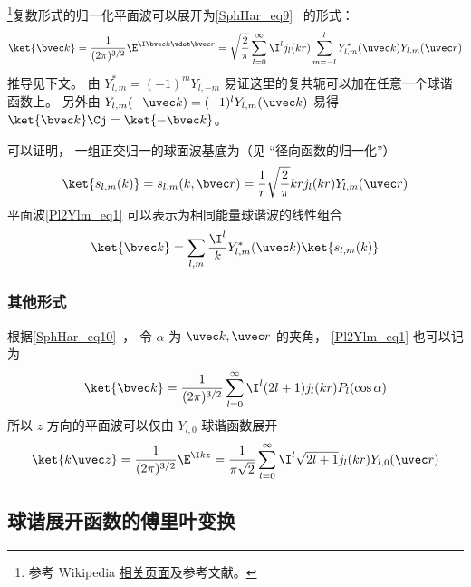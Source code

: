 

\footnote{参考 Wikipedia \href{https://en.wikipedia.org/wiki/Plane_wave_expansion}{相关页面}及参考文献。}复数形式的归一化平面波可以展开为\autoref{SphHar_eq9}~ 的形式：
\begin{equation}\label{Pl2Ylm_eq1}
\ket{\bvec k} = \frac{1}{(2\pi)^{3/2}}\E^{\I \bvec k \vdot \bvec r} = \sqrt{\frac{2}{\pi}} \sum_{l=0}^{\infty} \I^l  j_l(kr) \sum_{m=-l}^l Y_{l,m}^*(\uvec k) Y_{l,m}(\uvec r)
\end{equation}
推导见下文。 由 $Y_{l,m}^* = (-1)^m Y_{l,-m}$ 易证这里的复共轭可以加在任意一个球谐函数上。 另外由 $Y_{l,m}(-\uvec k) = (-1)^l Y_{l,m}(\uvec k)$ 易得 $\ket{\bvec k}\Cj = \ket{-\bvec k}$。

可以证明， 一组正交归一的球面波基底为（见 “径向函数的归一化”）
\begin{equation}
\ket{s_{l,m}(k)} = s_{l,m}(k,\bvec r) = \frac{1}{r}\sqrt{\frac{2}{\pi}}kr j_l(kr) Y_{l,m}(\uvec r)
\end{equation}
平面波\autoref{Pl2Ylm_eq1} 可以表示为相同能量球谐波的线性组合
\begin{equation}\label{Pl2Ylm_eq3}
\ket{\bvec k} = \sum_{l,m}\frac{\I^l}{k} Y_{l,m}^*(\uvec k)\ket{s_{l,m}(k)} 
\end{equation}

\subsubsection{其他形式}
根据\autoref{SphHar_eq10}~， 令 $\alpha$ 为 $\uvec k, \uvec r$ 的夹角， \autoref{Pl2Ylm_eq1} 也可以记为
\begin{equation}\label{Pl2Ylm_eq2}
\ket{\bvec k} = \frac{1}{(2\pi)^{3/2}} \sum_{l=0}^{\infty} \I^l (2l+1) j_l(kr) P_l(\cos\alpha)
\end{equation}
所以 $z$ 方向的平面波可以仅由 $Y_{l,0}$ 球谐函数展开
\begin{equation}
\ket{k\uvec z} = \frac{1}{(2\pi)^{3/2}}\E^{\I kz}
= \frac{1}{\pi\sqrt 2} \sum_{l=0}^{\infty} \I^l \sqrt{2l+1} j_l(kr) Y_{l,0}(\uvec r)
\end{equation}

\subsection{球谐展开函数的傅里叶变换}

